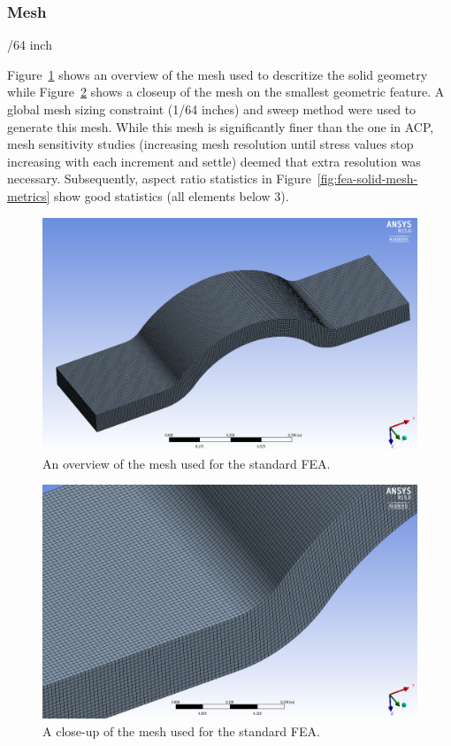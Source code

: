 \clearpage

\subsubsection{Mesh}

/64 inch

Figure~\ref{fig:fea-solid-mesh-overview} shows an overview of the mesh used to descritize the solid geometry while Figure~\ref{fig:fea-solid-mesh-closeup} shows a closeup of the mesh on the smallest geometric feature. A global mesh sizing constraint (1/64 inches) and sweep method were used to generate this mesh. While this mesh is significantly finer than the one in ACP, mesh sensitivity studies (increasing mesh resolution until stress values stop increasing with each increment and settle) deemed that extra resolution was necessary. Subsequently, aspect ratio statistics in Figure~\ref{fig:fea-solid-mesh-metrics} show good statistics (all elements below 3).\\

\begin{figure}[htp]
\centering
\includegraphics[width=1\textwidth]{./figures/fea/fea-solid-mesh-overview}
\caption{An overview of the mesh used for the standard FEA.}
\label{fig:fea-solid-mesh-overview}
\end{figure}

\begin{figure}[htp]
\centering
\includegraphics[width=1\textwidth]{./figures/fea/fea-solid-mesh-closeup}
\caption{A close-up of the mesh used for the standard FEA.}
\label{fig:fea-solid-mesh-closeup}
\end{figure}

